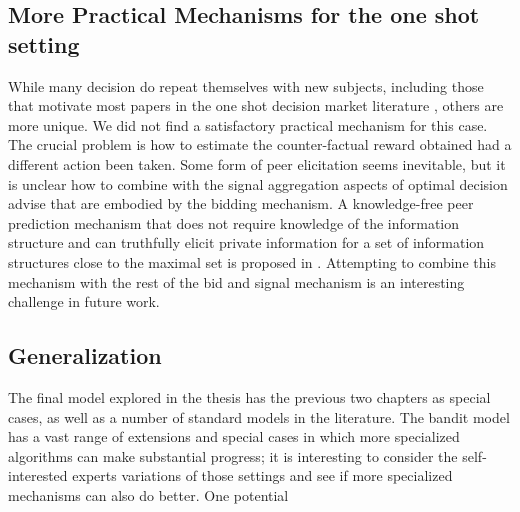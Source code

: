 

\subsection{More Practical Mechanisms for the one shot setting}

While many decision do repeat themselves with new subjects, including those that motivate most papers in the one shot decision market literature , others are more unique. 
We did not find a satisfactory practical mechanism for this case.
The crucial problem is how to estimate the counter-factual reward obtained had a different action been taken.
Some form of peer elicitation seems inevitable, but it is unclear how to combine with the signal aggregation aspects of optimal decision advise that are embodied by the bidding mechanism. 
A knowledge-free peer prediction mechanism that does not require knowledge of the information structure and
can truthfully elicit private information for a set of information structures close to the maximal set is proposed in \cite{zhang2014elicitability}. 
Attempting to combine this mechanism with the rest of the bid and signal mechanism is an interesting challenge in future work. 



\subsection{Generalization}

The final model explored in the thesis has the previous two chapters as special cases, as well as a number of standard models in the literature.
The bandit model has a vast range of extensions and special cases in which more specialized algorithms can make substantial progress; it is interesting to consider the self-interested experts variations of those settings and see if more specialized mechanisms can also do better.
One potential 


